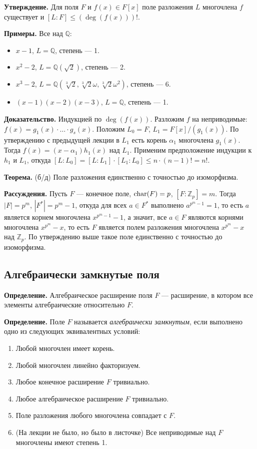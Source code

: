 \textbf{Утверждение.} Для поля $F$ и $f(x) \in F[x]$ поле разложения $L$ многочлена $f$ существует и $[L : F] \le (\deg(f(x)))!$.

\textbf{Примеры.} Все над $\mathbb Q$:
\begin{itemize}
    \item $x - 1$, $L = \mathbb Q$, степень --- 1.
    \item $x^2 - 2$, $L = \mathbb Q(\sqrt 2)$, степень --- 2.
    \item $x^3 - 2$, $L = \mathbb Q(\sqrt[3]{2}, \sqrt[3]{2} \omega, \sqrt[3]{2} \omega^2)$, степень --- 6.
    \item $(x - 1)(x - 2)(x - 3)$, $L = \mathbb Q$, степень --- 1.
\end{itemize}

\textbf{Доказательство.} Индукцией по $\deg(f(x))$.
Разложим $f$ на неприводимые: $f(x) = g_1(x) \cdot \ldots \cdot g_s(x)$.
Положим $L_0 = F$, $L_1 = F[x] / (g_1(x))$.
По утверждению с предыдущей лекции в $L_1$ есть корень $\alpha_1$ многочлена $g_1(x)$.
Тогда $f(x) = (x - \alpha_1) h_1(x)$ над $L_1$.
Применим предположение индукции к $h_1$ и $L_1$, откуда $[L : L_0] = [L : L_1] \cdot [L_1 : L_0] \le n \cdot (n - 1)! = n!$.

\QED

\textbf{Теорема.} (б/д) Поле разложения единственно с точностью до изоморфизма.

\textbf{Рассуждения.}
Пусть $F$ --- конечное поле, $\operatorname{char}(F) = p$, $[F : \mathbb Z_p] = m$.
Тогда $|F| = p^m$, $|F^*| = p^m - 1$, откуда для всех $a \in F^*$ выполнено $a^{p^m - 1} = 1$, то есть $a$ является корнем многочлена $x^{p^m - 1} - 1$, а значит, все $a \in F$ являются корнями многочлена $x^{p^m} - x$, то есть $F$ является полем разложения многочлена $x^{p^m} - x$ над $\mathbb Z_p$.
По утверждению выше такое поле единственно с точностью до изоморфизма.

\subsection{Алгебраически замкнутые поля}
\textbf{Определение.} Алгебраическое расширение поля $F$ --- расширение, в котором все элементы алгебраические относительно $F$.

\textbf{Определение.} Поле $F$ называется \textit{алгебраически замкнутым}, если выполнено одно из следующих эквивалентных условий:
\begin{enumerate}
    \item Любой многочлен имеет корень.
    \item Любой многочлен линейно факторизуем.
    \item Любое конечное расширение $F$ тривиально.
    \item Любое алгебраическое расширение $F$ тривиально.
    \item Поле разложения любого многочлена совпадает с $F$.
    \item (На лекции не было, но было в листочке) Все неприводимые над $F$ многочлены имеют степень 1.
\end{enumerate}

